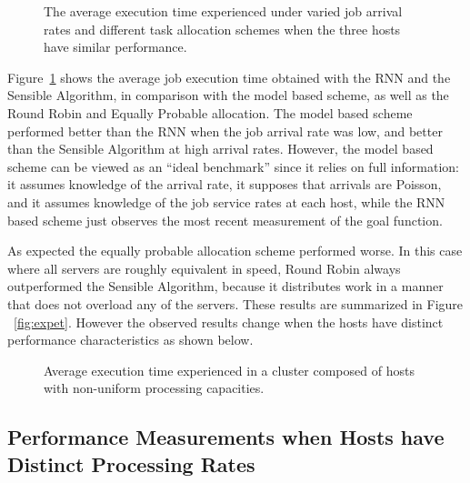 \documentclass[journal]{IEEEtran}
\begin{document}
\begin{figure}[ht]
	
		\centering
			 
     \caption{The average execution time experienced under varied job arrival rates and different task allocation schemes when the three hosts have similar performance.}
		\label{fig:etwithallalgo}
   \end{figure}

Figure~\ref{fig:etwithallalgo} shows  the average job execution time obtained with the RNN and the Sensible Algorithm, in comparison with the model based
scheme, as well as the Round Robin and Equally Probable allocation. The model based scheme performed better than the RNN when the job arrival rate was low, and better than the Sensible Algorithm 
at high arrival rates. 
However, the model based scheme can be viewed as an ``ideal benchmark'' since it relies on full information: it assumes knowledge of the arrival rate, it supposes that arrivals are Poisson,
and it assumes knowledge of the job service rates at each host, while the RNN based scheme just observes the most recent measurement of the goal function.

As expected the equally probable allocation scheme performed worse. In this case where all servers are roughly equivalent in speed,  Round Robin always outperformed the Sensible Algorithm, because it distributes work in a manner that does not overload any of the servers. These results are summarized in  Figure ~\ref{fig:expet}. However the observed results change when the hosts have distinct performance characteristics as shown below.

	
		\begin{figure}[ht]
		
		\centering
			 
     \caption{Average execution time experienced in a cluster composed of hosts with non-uniform processing capacities.}
		\label{fig:et_stressed}
   \end{figure}
	
\subsection{Performance Measurements when Hosts have Distinct Processing Rates}
\label{performanceevaluationununiform}
\end{document}
